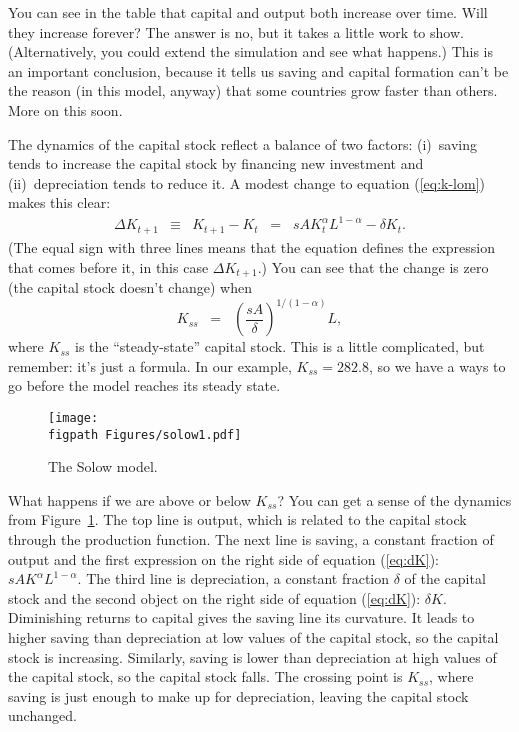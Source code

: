 You can see in the table
that capital and output both increase over time.
Will they increase forever?
The answer is no, but it takes a little work to
show. (Alternatively, you could extend the simulation and see what
happens.)
This is an important conclusion, because it tells us saving
and capital formation can't be the reason
(in this model, anyway)
that some countries grow faster than others.  More on this soon.


The dynamics of the capital stock reflect a balance of two factors:
(i)~saving tends to increase the capital stock by financing new investment
and (ii)~depreciation tends to reduce it.
A modest change to equation (\ref{eq:k-lom}) makes this clear:
\begin{eqnarray}
    \Delta K_{t+1} &\equiv& K_{t+1} - K_t
            \;\;=\;\;  s A K_t^\alpha L^{1-\alpha} - \delta K_t .
            \label{eq:dK}
\end{eqnarray}
(The equal sign with three lines means that the equation defines
the expression that comes before it, in this case $\Delta K_{t+1}$.)
You can see that the change is zero (the capital stock doesn't change)
when
\[
    K_{ss} \;\;=\;\; \left( \frac{s A}{\delta} \right)^{1/(1-\alpha)} L ,
\]
where $K_{ss}$ is the ``steady-state'' capital stock.
This is a little complicated, but remember:  it's just a formula.
In our example, $K_{ss} = 282.8$, so we have a ways to go before the model reaches
its steady state.
\begin{figure}[ht]
    \caption{The Solow model.}
    \centering
    \texttt{[image: \\figpath Figures/solow1.pdf]}\\
    \label{fig:solow1}
\end{figure}

What happens if we are above or below $K_{ss}$?
You can get a sense of the dynamics from Figure~\ref{fig:solow1}.
The top line is output,
which is related to the capital stock through the production function.
The next line is saving, a constant fraction of output
and the first expression on the right side of equation (\ref{eq:dK}):  $s A K^\alpha L^{1-\alpha} $.
The third line is depreciation, a constant fraction $\delta$
of the capital stock and the second object on the right side of equation (\ref{eq:dK}):  $\delta K $.
Diminishing returns to capital gives the saving line its curvature.
It leads to higher saving than depreciation at low
values of the capital stock, so the capital stock is increasing.
Similarly, saving is lower than depreciation at high values of the capital stock,
so the capital stock falls.
The crossing point is $K_{ss}$, where saving is just enough to
make up for depreciation, leaving the capital stock unchanged.


